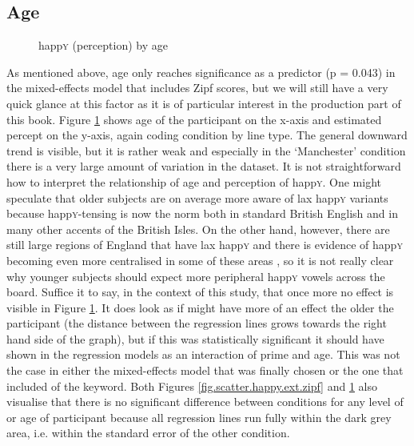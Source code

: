 \subsection{Age}
\label{sec.perc_res.happy.age}

\begin{figure}[h]
	\centering
		\resizebox{.49\linewidth}{!}{} 
	\caption{happ\textsc{y} (perception) by age}
	\label{fig.scatter.happy.ext.age}
\end{figure}

As mentioned above, age only reaches significance as a predictor (p = 0.043) in the mixed-effects model that includes Zipf scores, but we will still have a very quick glance at this factor as it is of particular interest in the production part of this book.
Figure \ref{fig.scatter.happy.ext.age} shows age of the participant on the x-axis and estimated percept on the y-axis, again coding  condition by line type.
The general downward trend is visible, but it is rather weak and especially in the `Manchester' condition there is a very large amount of variation in the dataset.
It is not straightforward how to interpret the relationship of age and perception of happ\textsc{y}.
One might speculate that older subjects are on average more aware of lax happ\textsc{y} variants because happ\textsc{y}-tensing is now the norm both in standard British English and in many other accents of the British Isles.
On the other hand, however, there are still large regions of England that have lax happ\textsc{y} and there is evidence of happ\textsc{y} becoming even more centralised in some of these areas \parencite[cf.][]{flynn2010}, so it is not really clear why younger subjects should expect more peripheral happ\textsc{y} vowels across the board.
Suffice it to say, in the context of this study, that once more no  effect is visible in Figure \ref{fig.scatter.happy.ext.age}.
It does look as if  might have more of an effect the older the participant (the distance between the regression lines grows towards the right hand side of the graph), but if this was statistically significant it should have shown in the regression models as an interaction of prime and age.
This was not the case in either the mixed-effects model that was finally chosen or the one that included  of the keyword.
Both Figures \ref{fig.scatter.happy.ext.zipf} and \ref{fig.scatter.happy.ext.age} also visualise that there is no significant difference between  conditions for any level of  or age of participant because all regression lines run fully within the dark grey area, i.e. within the standard error of the other condition.

